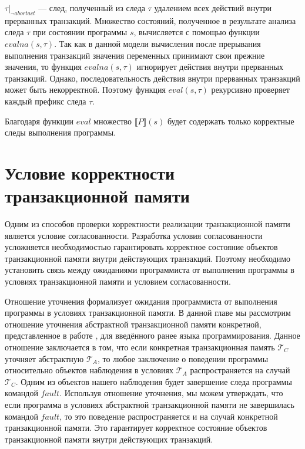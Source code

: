 $\tau |_{\neg abortact}$ --- след, полученный из следа $\tau$ удалением всех действий внутри прерванных транзакций. Множество состояний, полученное в результате анализа следа $\tau$ при состоянии программы $s$, вычисляется с помощью функции $evalna(s, \tau)$. Так как в данной модели вычисления после прерывания выполнения транзакций значения переменных принимают свои прежние значения, то функция $evalna(s, \tau)$ игнорирует действия внутри прерванных транзакций. Однако, последовательность действия внутри прерванных транзакций может быть некорректной. Поэтому функция $eval(s,\tau)$ рекурсивно проверяет каждый префикс следа $\tau$.

Благодаря функции $eval$ множество $\llbracket P \rrbracket(s)$ будет содержать только корректные следы выполнения программы.

\chapter{Условие корректности транзакционной памяти}
Одним из способов проверки корректности реализации транзакционной памяти является условие согласованности. Разработка условия согласованности усложняется необходимостью гарантировать корректное состояние объектов транзакционной памяти внутри действующих транзакций. Поэтому необходимо установить связь между ожиданиями программиста от выполнения программы в условиях транзакционной памяти и условием согласованности. 

Отношение уточнения формализует ожидания программиста от выполнения программы в условиях транзакционной памяти. В данной главе мы рассмотрим отношение уточнения абстрактной транзакционной памяти конкретной, представленное в работе \cite{tms_article}, для введённого ранее языка программирования. Данное отношение заключается в том, что если конкретная транзакционная память $\mathcal{T}_C$ уточняет абстрактную $\mathcal{T}_A$, то любое заключение о поведении программы относительно объектов наблюдения в условиях $\mathcal{T}_A$ распространяется на случай $\mathcal{T}_C$. Одним из объектов нашего наблюдения будет завершение следа программы командой $fault$. Используя отношение уточнения, мы можем утверждать, что если программа в условиях абстрактной транзакционной памяти не завершилась командой $fault$, то это поведение распространяется и на случай конкретной транзакционной памяти. Это гарантирует корректное состояние объектов транзакционной памяти внутри действующих транзакций. 

